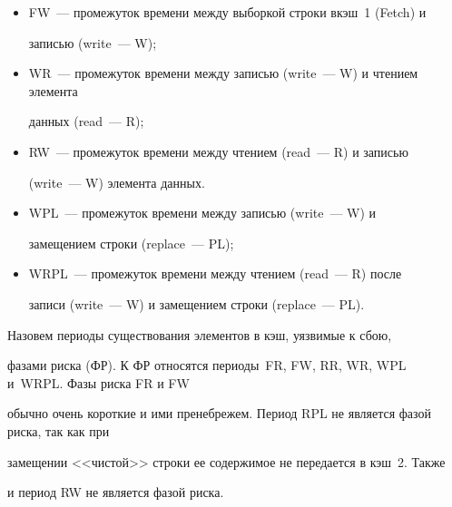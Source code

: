           \begin{itemize}


\item FW~--- промежуток времени между выборкой строки в\linebreak кэш~1 (Fetch) и 


записью (write~--- W);


\item WR~--- промежуток времени между  записью (write~--- W)  и чтением элемента  


данных (read~--- R);


\item RW~---   промежуток времени между  чтением (read~--- R)  и записью 


(write~--- W)   элемента  данных.


\item WPL~--- промежуток времени между  записью (write~--- W)   и 


замещением строки (replace~--- PL);


\item WRPL~---  промежуток времени между  чтением (read~--- R) после 


записи (write~--- W) и  замещением строки (replace~--- PL).


\end{itemize}


      


      


      Назовем  периоды существования элементов в кэш, уязвимые к сбою,  


фазами риска (ФР). К ФР  относятся периоды~FR, FW, RR, WR, WPL и~WRPL. Фазы риска FR и FW 


обычно очень короткие и ими пренебрежем. Период  RPL не является фазой риска, так как при 


замещении <<чистой>> строки ее содержимое не передается в кэш~2. Также 


и период  RW  не является фазой риска.





